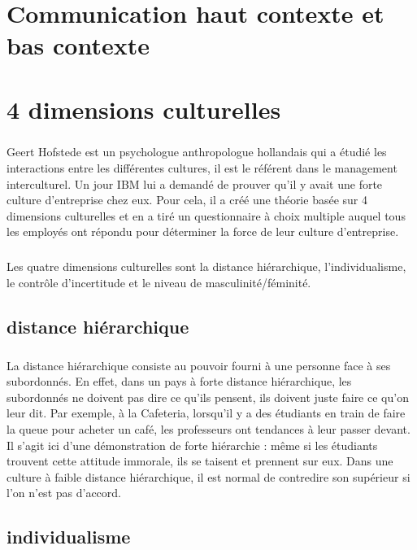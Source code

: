 \chapter{Communication haut contexte et bas contexte}

\chapter{4 dimensions culturelles}
\paragraph{}
Geert Hofstede est un psychologue anthropologue hollandais qui a étudié les interactions entre les différentes cultures, il est le référent dans le management interculturel. Un jour IBM lui a demandé de prouver qu’il y avait une forte culture d’entreprise chez eux. Pour cela, il a créé une théorie basée sur 4 dimensions culturelles et en a tiré un questionnaire à choix multiple auquel tous les employés ont répondu pour déterminer la force de leur culture d’entreprise.
\paragraph{}
Les quatre dimensions culturelles sont la distance hiérarchique, l’individualisme, le contrôle d’incertitude et le niveau de masculinité/féminité.

\section{distance hiérarchique}
\paragraph{}
La distance hiérarchique consiste au pouvoir fourni à une personne face à ses subordonnés. En effet, dans un pays à forte distance hiérarchique, les subordonnés ne doivent pas dire ce qu’ils pensent, ils doivent juste faire ce qu’on leur dit. Par exemple, à la Cafeteria, lorsqu’il y a des étudiants en train de faire la queue pour acheter un café, les professeurs ont tendances à leur passer devant. Il s’agit ici d’une démonstration de forte hiérarchie : même si les étudiants trouvent cette attitude immorale, ils se taisent et prennent sur eux. Dans une culture à faible distance hiérarchique, il est normal de contredire son supérieur si l’on n’est pas d’accord. 

\section{individualisme}
